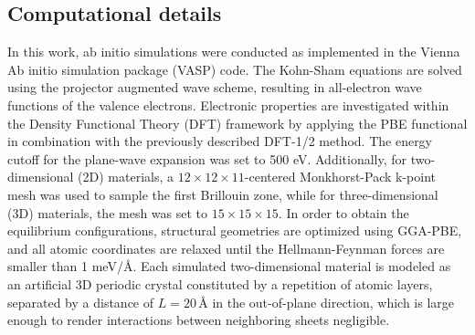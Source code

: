 \subsection{Computational details}
In this work, ab initio simulations were conducted as implemented in the Vienna Ab initio simulation package (VASP) \cite{vasp_1} \cite{vasp_2}code. The Kohn-Sham equations are solved using the projector augmented wave scheme, resulting in all-electron wave functions of the valence electrons. Electronic properties are investigated within the Density Functional Theory (DFT) framework by applying the PBE functional in combination with the previously described DFT-1/2 method. The energy cutoff for the plane-wave expansion was set to 500 eV. Additionally, for two-dimensional (2D) materials, a $12 \times 12 \times 11$-centered Monkhorst-Pack k-point mesh was used to sample the first Brillouin zone, while for three-dimensional (3D) materials, the mesh was set to $15 \times 15 \times 15$. In order to obtain the equilibrium configurations, structural geometries are optimized using GGA-PBE\cite{PBE}, and all atomic coordinates are relaxed until the Hellmann-Feynman forces are smaller than 1 meV/\AA{}. Each simulated two-dimensional material is modeled as an artificial 3D periodic crystal constituted by a repetition of atomic layers, separated by a distance of $L = 20\,\text{\AA}$  in the out-of-plane direction, which is large enough to render interactions between neighboring sheets negligible.
